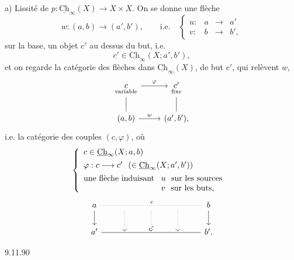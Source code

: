 \documentclass[11pt]{article}
\newcommand{\printedpage}[1]{\marginpar{\footnotesize p.~#1}}
\newcommand{\msp}[1]{\marginpar{\footnotesize [#1]}}
\newcommand{\Ch}{\underline{\mathrm{Ch}}}
\begin{document}
a) Lissité de $p : \Ch_{\infty}(X) \longrightarrow X \times X$. On se donne une flèche
\[
w : (a,b) \longrightarrow (a',b'), \qquad \text{i.e.} \quad \left\{ \begin{array}{lccc} u : & a & \longrightarrow & a' \\[1ex] v : & b & \longrightarrow & b', \end{array} \right.
\]
sur la base, un objet $c'$ au dessus du but, i.e.
\[
c' \in \Ch_{\infty}(X; a', b'),
\]
et on regarde la catégorie des flèches dans $\Ch_{\infty}(X)$, de but $c'$, qui relèvent $w$,
\[
\begin{tikzcd}
\underset{\text{\scriptsize variable}}{c} \arrow[r, "\varphi"] \arrow[d, dash] & \underset{\text{\scriptsize fixe}}{c'} \arrow[d, dash] \\
(a,b) \arrow[r, "w"] & (a',b'),
\end{tikzcd}
\]
\printedpage{90}
i.e. la catégorie des couples $(c,\varphi)$, où
\[
\left\{ \begin{array}{l}
c \in \Ch_{\infty}(X; a, b) \\[1ex]
\varphi : c \longrightarrow c' \ \ (\in \Ch_{\infty}(X; a', b')) \\[1ex]
\text{une flèche induisant } \begin{array}[t]{l} u \ \text{ sur les sources} \\ v \ \text{ sur les buts,} \end{array}
\end{array} \right.
\]
\[
\begin{tikzcd}
a \arrow[rrrr, dotted, dash, "c"] \arrow[d] & {} \arrow[d, dotted] & {} \arrow[d, dotted] & {} \arrow[d, dotted] & b \arrow[d] \\
a' \arrow[rrrr, dash, "c'"] & {} & {} & {} & b'.
\end{tikzcd}
\]

\msp{page 145}
\begin{flushright}
{\footnotesize 9.11.90}
\end{flushright}
\end{document}
